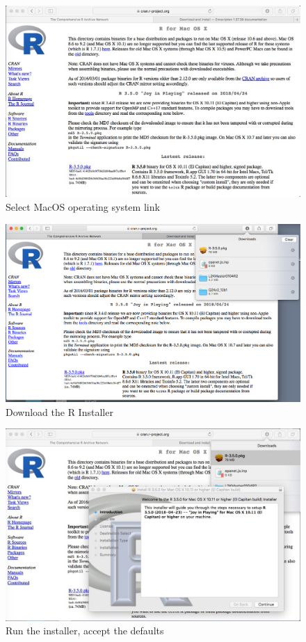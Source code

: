 \begin{figure}[h!] %
   \centering
   \includegraphics[width=5in]{./1-Introduction/SelectOS-Mac.jpeg} 
   \caption{Select MacOS operating system link}
\end{figure}

\begin{figure}[h!] %
   \centering
   \includegraphics[width=5in]{./1-Introduction/DownloadR-pkg.jpg} 
   \caption{Download the R Installer}
\end{figure}

\begin{figure}[h!] %
   \centering
   \includegraphics[width=5in]{./1-Introduction/RunInstallerMAC.jpeg} 
   \caption{Run the installer, accept the defaults}
\end{figure}

